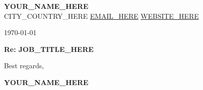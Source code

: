 \documentclass[12pt,a4paper]{article}
\begin{document}
\noindent
{\Large\bfseries\color{darkgray} YOUR_NAME_HERE} \\[4pt]
{\color{lightgray} CITY_COUNTRY_HERE \textbar{} \href{mailto:EMAIL_HERE}{EMAIL_HERE} \textbar{} \href{https://WEBSITE_HERE}{WEBSITE_HERE}}

\vspace{24pt}

\noindent
\today

\vspace{16pt}

\noindent

\vspace{16pt}

\noindent
\textbf{Re: JOB_TITLE_HERE}

\vspace{20pt}


\vspace{24pt}

\noindent
Best regards,

\vspace{40pt}

\noindent
\textbf{YOUR_NAME_HERE}
\end{document}
